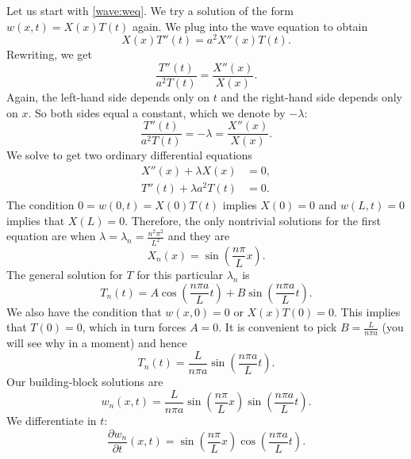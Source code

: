 Let us start with \eqref{wave:weq}.
We try a solution of the form $w(x,t) = X(x) T(t)$ again.  We plug into
the wave equation to obtain
\begin{equation*}
X(x)T''(t) = a^2 X''(x) T(t) .
\end{equation*}
Rewriting, we get
\begin{equation*}
\frac{T''(t)}{a^2 T(t)} = \frac{X''(x)}{X(x)} .
\end{equation*}
Again, the left-hand side depends only on $t$ and the right-hand side depends
only on $x$.  So both sides equal a constant, which we denote by
$-\lambda$:
\begin{equation*}
\frac{T''(t)}{a^2 T(t)} = -\lambda = \frac{X''(x)}{X(x)} .
\end{equation*}
We solve to get two ordinary differential equations
\begin{align*}
X''(x) + \lambda X(x) &= 0 , \\
T''(t) + \lambda a^2 T(t) &= 0 .
\end{align*}
The condition $0 = w(0,t) = X(0) T(t)$ implies $X(0) = 0$ and
$w(L,t) = 0$ implies that $X(L) = 0$.  Therefore, the only nontrivial
solutions for the first equation are when
$\lambda = \lambda_n = \frac{n^2 \pi^2}{L^2}$ and they are
\begin{equation*}
X_n(x) = \sin \left( \frac{n \pi}{L} x \right) .
\end{equation*}
The general solution for $T$ for this particular $\lambda_n$ is
\begin{equation*}
T_n(t) = A \cos \left( \frac{n \pi a}{L} t \right)
+ B \sin \left( \frac{n \pi a}{L} t \right).
\end{equation*}
We also have the condition that $w(x,0) = 0$ or $X(x)T(0) = 0$.  This
implies that $T(0) = 0$, which in turn forces $A = 0$.  It is
convenient to pick $B=\frac{L}{n \pi a}$ (you will see why in a moment)
and hence
\begin{equation*}
T_n(t) = \frac{L}{n \pi a} \sin \left( \frac{n \pi a}{L} t \right).
\end{equation*}
Our building-block solutions are
\begin{equation*}
w_n(x,t) = 
\frac{L}{n \pi a} 
\sin \left( \frac{n \pi}{L} x \right)
\sin \left( \frac{n \pi a}{L} t \right) .
\end{equation*}
We differentiate in $t$:
\begin{equation*}
\frac{\partial w_n}{\partial t}(x,t) = 
\sin \left( \frac{n \pi}{L} x \right)
\cos \left( \frac{n \pi a}{L} t \right) .
\end{equation*}
